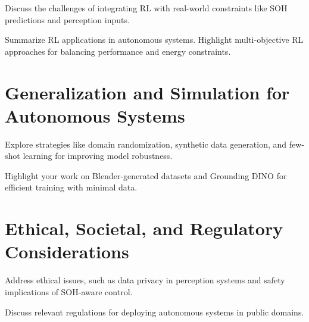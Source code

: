 Discuss the challenges of integrating RL with real-world constraints like SOH predictions and perception inputs.

Summarize RL applications in autonomous systems.
Highlight multi-objective RL approaches for balancing performance and energy constraints.


\section{Generalization and Simulation for Autonomous Systems}

Explore strategies like domain randomization, synthetic data generation, and few-shot learning for improving model robustness.


Highlight your work on Blender-generated datasets and Grounding DINO for efficient training with minimal data.


\section{Ethical, Societal, and Regulatory Considerations}


Address ethical issues, such as data privacy in perception systems and safety implications of SOH-aware control.

Discuss relevant regulations for deploying autonomous systems in public domains.


\endinput